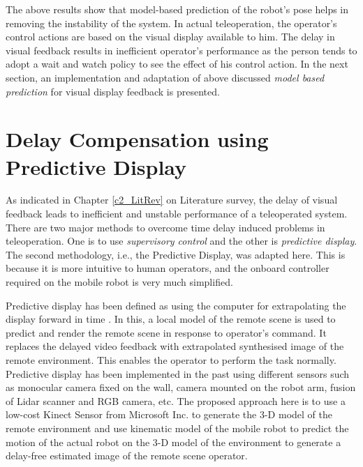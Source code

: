 The above results show that model-based prediction of the robot's pose helps in removing the instability of the system. In  actual teleoperation, the operator's control actions are based on the visual display available to him.  The delay in visual feedback results in inefficient operator's performance as the person tends to adopt a wait and watch policy to see the effect of his control action. In the next section,  an implementation and adaptation  of above discussed \textit{model based prediction }  for  visual display feedback is presented.   
  
\section{Delay Compensation using Predictive Display}
As indicated in Chapter \ref{c2_LitRev} on Literature survey,  the delay of visual feedback leads to inefficient and unstable performance of a teleoperated system. There are two major methods to overcome time delay induced problems in teleoperation. One is to use \textit{supervisory control} and the other is \textit{predictive display}. The second methodology, i.e., the Predictive Display, was adapted here. This is because it is more intuitive to human operators, and the onboard controller  required on the mobile robot is very much simplified.  

  
Predictive display has been defined as using the computer for extrapolating the display forward in time \cite{sheridan}. In this, a local model of the remote scene is used to predict and render the remote scene in response to operator's command. It replaces the delayed video feedback with extrapolated synthesised  image of the remote environment. This enables the operator to perform the task normally. Predictive display has been implemented in the past using different sensors such as monocular camera fixed on the wall, camera mounted on the robot arm, fusion of Lidar scanner and RGB camera, etc. 
The proposed approach here is to use a low-cost  Kinect Sensor from Microsoft Inc. to generate the 3-D model of the remote environment and use kinematic model of the mobile robot to predict the motion of the actual robot on the 3-D model of the environment  to generate a delay-free estimated image of the remote scene operator.

